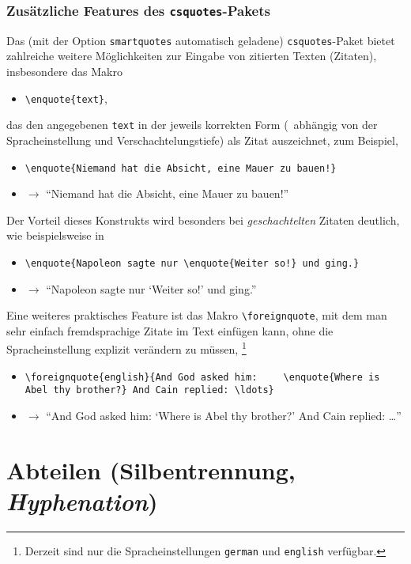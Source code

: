 \subsubsection{Zusätzliche Features des \texttt{csquotes}-Pakets}

Das (mit der Option \texttt{smartquotes} automatisch geladene)
\texttt{csquotes}-Paket bietet zahlreiche weitere Möglichkeiten zur Eingabe
von zitierten Texten (Zitaten), insbesondere das Makro
%
\begin{itemize}
    \item[] \verb!\enquote{text}!,
\end{itemize}
%
das den angegebenen \texttt{text} in der jeweils korrekten Form (\ua\
abhängig von der Sprach\-einstellung und Verschachtelungstiefe) als Zitat
auszeichnet, zum Beispiel,
%
\begin{itemize}
    \item[] \verb|\enquote{Niemand hat die Absicht, eine Mauer zu bauen!}|
    \item[] $\rightarrow$ \enquote{Niemand hat die Absicht, eine Mauer zu
    bauen!}
\end{itemize}
%
Der Vorteil dieses Konstrukts wird besonders bei \emph{geschachtelten}
Zitaten deutlich, wie beispielsweise in
%
\begin{itemize}
    \item[] \verb|\enquote{Napoleon sagte nur \enquote{Weiter so!} und ging.}|
    \item[] $\rightarrow$ \enquote{Napoleon sagte nur \enquote{Weiter so!}
    und ging.}
\end{itemize}
%
Eine weiteres praktisches Feature ist das Makro \verb!\foreignquote!, mit dem
man sehr einfach fremdsprachige Zitate im Text einfügen kann, ohne die
Spracheinstellung explizit verändern zu müssen, \zB%
\footnote{Derzeit sind nur die Spracheinstellungen \texttt{german} und
\texttt{english} verfügbar.}
%
\begin{itemize}
    \item[] \verb|\foreignquote{english}{And God asked him: |\newline
    \verb|   \enquote{Where is Abel thy brother?} And Cain replied: \ldots}|
    \item[] $\rightarrow$ \foreignquote{english}{And God asked him:
    \enquote{Where is Abel thy brother?} And Cain replied: \ldots}
\end{itemize}


\section{Abteilen (Silbentrennung, \emph{Hyphenation})}
\label{subsec:layout-abteilen}

